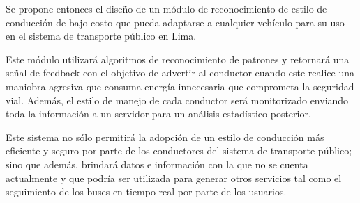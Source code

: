 Se propone entonces el diseño de un módulo de reconocimiento de estilo de conducción de bajo costo que pueda adaptarse a cualquier vehículo para su uso en el sistema de transporte público en Lima.

Este módulo utilizará algoritmos de reconocimiento de patrones y retornará una señal de feedback con el objetivo de advertir al conductor cuando este realice una maniobra agresiva que consuma energía innecesaria que comprometa la seguridad vial. Además, el estilo de manejo de cada conductor será monitorizado enviando toda la información a un servidor para un análisis estadístico posterior.

Este sistema no sólo permitirá la adopción de un estilo de conducción más eficiente y seguro por parte de los conductores del sistema de transporte público; sino que además, brindará datos e información con la que no se cuenta actualmente y que podría ser utilizada para generar otros servicios tal como el seguimiento de los buses en tiempo real por parte de los usuarios.
